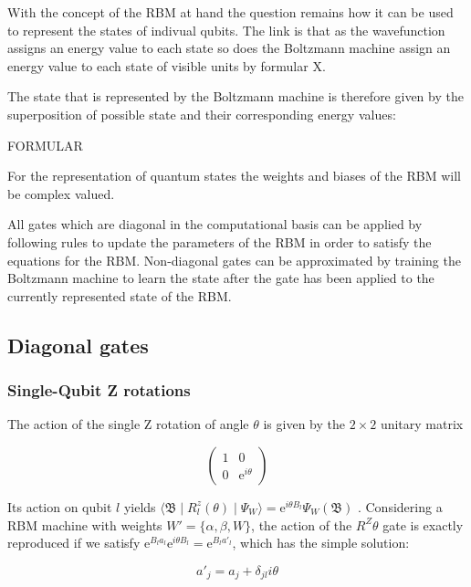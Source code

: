 With the concept of the RBM at hand the question remains how it can be used to represent the states of indivual qubits. The
link is that as the wavefunction assigns an energy value to each state so does the Boltzmann machine assign an energy value 
to each state of visible units by formular X.

The state that is represented by the Boltzmann machine is therefore given by the superposition of possible state and their 
corresponding energy values:

FORMULAR

For the representation of quantum states the weights and biases of the RBM will be complex valued.

All gates which are diagonal in the computational basis can be applied by following rules to update the parameters of the RBM
in order to satisfy the equations for the RBM. Non-diagonal gates can be approximated by training the Boltzmann machine to 
learn the state after the gate has been applied to the currently represented state of the RBM.

\subsection{Diagonal gates}
\subsubsection{Single-Qubit Z rotations}
The action of the single Z rotation of angle $\theta$ is given by the $2\times2$ unitary matrix

\begin{equation}
    \begin{pmatrix}
        1 & 0 \\
        0 & \mathrm{e}^{i\theta}
    \end{pmatrix}
\end{equation}

Its action on qubit $l$ yields 
$\langle \mathfrak{B} \mid R_{l}^{z}(\theta) \mid \Psi_{W}  \rangle = 
\mathrm{e}^{i\theta B_{l}} \Psi_{W}(\mathfrak{B})
$
. Considering a RBM machine with weights $W\prime = \{\alpha,\beta,W\}$, the action of the $R^{Z}{\theta}$
gate is exactly reproduced if we satisfy $\mathrm{e}^{B_{l}a_{l}}\mathrm{e}^{i\theta B_{l}} = \mathrm{e}^{B_{l}a\prime_{l}}$,
which has the simple solution:

\begin{equation}
    a\prime_{j} = a_{j} + \delta_{jl}i\theta
\end{equation}

